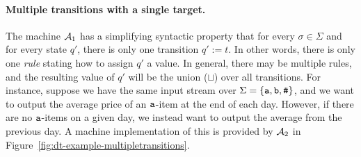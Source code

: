 \paragraph*{Multiple transitions with a single target.}
The machine $\mathcal{A}_1$ has a simplifying syntactic property that for every $\sigma \in \Sigma$ and for every state $q'$, there is only one transition $q' := t$. In other words, there is only one \emph{rule} stating how to assign $q'$ a value. In general, there may be multiple rules, and the resulting value of $q'$ will be the union ($\sqcup$) over all transitions.
For instance, suppose we have the same input stream over $\Sigma = \{\texttt{a}, \texttt{b}, \texttt{\#}\}$, and we want to output the average price of an $\texttt{a}$-item at the end of each day. However, if there are no $\texttt{a}$-items on a given day, we instead want to output the average from the previous day. A machine implementation of this is provided by $\mathcal{A}_2$ in Figure~\ref{fig:dt-example-multipletransitions}.

